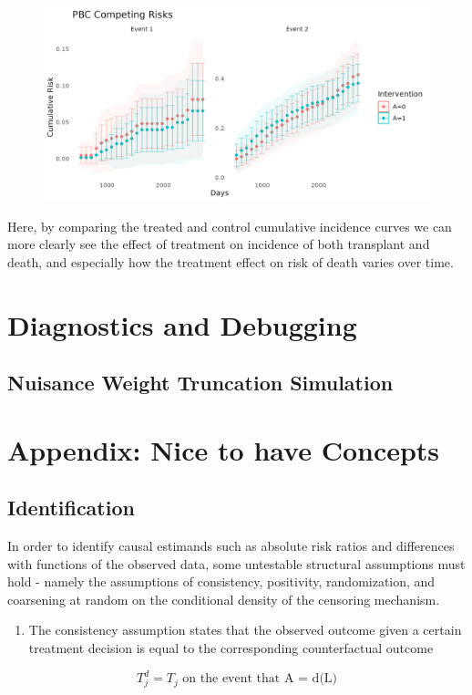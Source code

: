 \documentclass{report}
\newcommand{\1}{\ensuremath{\mathbf{1}}}
\begin{document}
\begin{figure}[H]
\includegraphics[width=\linewidth]{fig/concrete-pbc.png}
\end{figure}

Here, by comparing the treated and control cumulative incidence curves we can more clearly see the effect of treatment on incidence of both transplant and death, and especially how the treatment effect on risk of death varies over time. 

\section{Diagnostics and Debugging}
\label{sec:org5e6ce4d}

\subsection{Nuisance Weight Truncation Simulation}
\label{sec:org4ce6654}


\section{Appendix: Nice to have Concepts}
\label{sec:org38c2dc8}

\subsection{Identification}
\label{identification}
In order to identify causal estimands such as absolute risk ratios and differences with functions of the observed data, some untestable structural assumptions must hold - namely the assumptions of consistency, positivity, randomization, and coarsening at random on the conditional density of the censoring mechanism. 


\begin{enumerate}
\item The consistency assumption states that the observed outcome given a certain treatment decision is equal to the corresponding counterfactual outcome
\end{enumerate}
\[ T^d_j = T_j \text{ on the event that A = d(L)} \]
\end{document}
